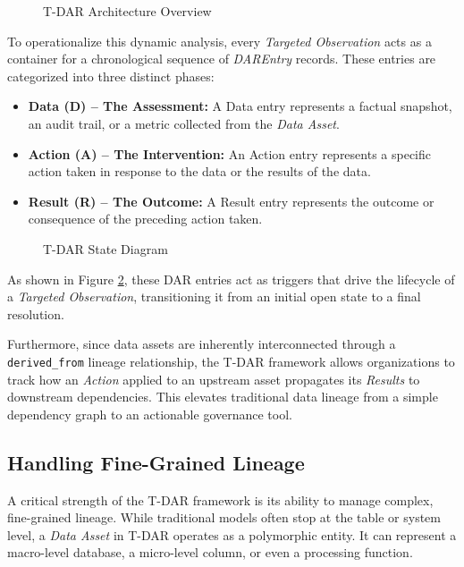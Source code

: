 \documentclass[11pt,a4paper]{article}
\begin{document}
\begin{figure}[H]
    \centering
    \caption{T-DAR Architecture Overview}
    \label{fig:tdar_architecture}
\end{figure}

To operationalize this dynamic analysis, every \textit{Targeted Observation} acts as a container for a chronological sequence of \textit{DAREntry} records. These entries are categorized into three distinct phases:
\begin{itemize}
    \item \textbf{Data (D) -- The Assessment:} A Data entry represents a factual snapshot, an audit trail, or a metric collected from the \textit{Data Asset}.
    \item \textbf{Action (A) -- The Intervention:} An Action entry represents a specific action taken in response to the data or the results of the data.
    \item \textbf{Result (R) -- The Outcome:} A Result entry represents the outcome or consequence of the preceding action taken.
\end{itemize}

\begin{figure}[H]
    \centering
    \caption{T-DAR State Diagram}
    \label{fig:tdar_state}
\end{figure}

As shown in Figure \ref{fig:tdar_state}, these DAR entries act as triggers that drive the lifecycle of a \textit{Targeted Observation}, transitioning it from an initial open state to a final resolution.

Furthermore, since data assets are inherently interconnected through a \nolinkurl{derived_from} lineage relationship, the T-DAR framework allows organizations to track how an \textit{Action} applied to an upstream asset propagates its \textit{Results} to downstream dependencies. This elevates traditional data lineage from a simple dependency graph to an actionable governance tool.

\subsection{Handling Fine-Grained Lineage}
A critical strength of the T-DAR framework is its ability to manage complex, fine-grained lineage. While traditional models often stop at the table or system level, a \textit{Data Asset} in T-DAR operates as a polymorphic entity. It can represent a macro-level database, a micro-level column, or even a processing function. 
\end{document}
